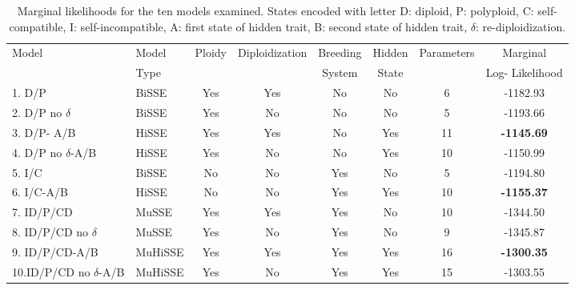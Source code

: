 \begin{table}
\begin{tabular}{@{}llcccccc@{}} \toprule
Model& Model& Ploidy & Diploidization & Breeding  & Hidden & Parameters & Marginal \\
& Type & &  &System & State & & Log- Likelihood \\
1. D/P &BiSSE &	Yes  &	Yes &	No	&No	& 6	& -1182.93 \\
2. D/P no $\delta$ & BiSSE  &	Yes & 	No	& No	& No & 	5 &	-1193.66\\
3. D/P- A/B  & HiSSE &	Yes &	Yes	&No &	Yes &	11 &	\textbf{-1145.69}\\
4. D/P no $\delta$-A/B &	HiSSE &	Yes & No &	No &	Yes &	10	&-1150.99\\
5. I/C &	BiSSE &	No &	 No	&Yes &	No &	 5 &  -1194.80 \\
6. I/C-A/B &	HiSSE &	No &	 No	&Yes &	Yes	& 10 & \textbf{-1155.37}\\
7. ID/P/CD & MuSSE &	Yes & 	Yes &	Yes &	No &	10 & -1344.50\\
8. ID/P/CD no $\delta$ &	MuSSE &	Yes & 	No &	Yes	&No &	9 &-1345.87\\
9. ID/P/CD-A/B & MuHiSSE &	Yes 	&Yes &	Yes &	Yes &	16 & \textbf{-1300.35} \\
10.ID/P/CD no $\delta$-A/B &	 MuHiSSE	 & Yes & 	No	&Yes &	Yes	&15 &-1303.55 \\ \bottomrule
\end{tabular}
\caption{Marginal likelihoods for the ten models examined. States encoded with letter D: diploid, P: polyploid, C: self-compatible, I: self-incompatible, A: first state of hidden trait, B: second state of hidden trait, $\delta$: re-diploidization.}
\label{table:marginallike}
\end{table}

